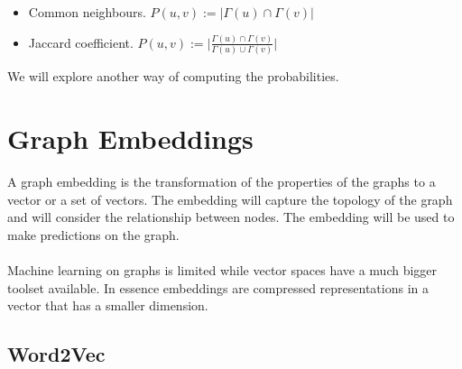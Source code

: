  \begin{itemize}
  \item Common neighbours. $P(u,v):= \lvert\Gamma(u) \cap \Gamma(v)\rvert$
  
  
  
  \item Jaccard coefficient. $P(u,v):= \lvert\frac{\Gamma(u) \cap \Gamma(v)}{\Gamma(u) \cup \Gamma(v)}\rvert$
\end{itemize}

\noindent We will explore another way of computing the probabilities.

\clearpage

\section{Graph Embeddings}
\label{sec:embeddings}

A graph embedding is the transformation of the properties of the graphs to a vector or a set of vectors. The embedding will capture the topology of the graph and will consider the relationship between nodes. The embedding will be used to make predictions on the graph.
\\
\\
\noindent Machine learning on graphs is limited while vector spaces have a much bigger toolset available. In essence embeddings are compressed representations in a vector that has a smaller dimension.

\subsection{Word2Vec}

